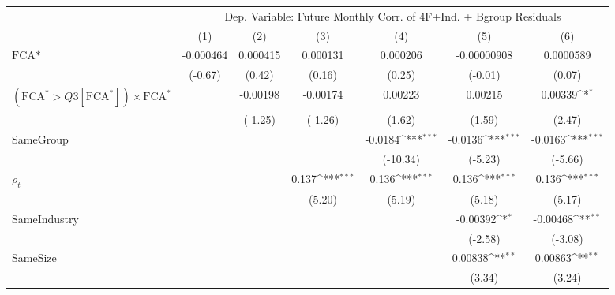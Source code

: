{
\def\sym#1{\ifmmode^{#1}\else\(^{#1}\)\fi}
\begin{tabular}{l*{6}{c}}
\hline\hline
                &\multicolumn{6}{c}{Dep. Variable: Future Monthly Corr. of 4F+Ind. + Bgroup Residuals}                            \\\cmidrule(lr){2-7}
                &\multicolumn{1}{c}{(1)}         &\multicolumn{1}{c}{(2)}         &\multicolumn{1}{c}{(3)}         &\multicolumn{1}{c}{(4)}         &\multicolumn{1}{c}{(5)}         &\multicolumn{1}{c}{(6)}         \\
\hline
$ \text{FCA*} $ &-0.000464         & 0.000415         & 0.000131         & 0.000206         &-0.00000908         &0.0000589         \\
                &  (-0.67)         &   (0.42)         &   (0.16)         &   (0.25)         &  (-0.01)         &   (0.07)         \\
[1em]
 $ (\text{FCA}^* > Q3[\text{FCA}^*]) \times {\text{FCA} ^*}  $ &                  & -0.00198         & -0.00174         &  0.00223         &  0.00215         &  0.00339\sym{*}  \\
                &                  &  (-1.25)         &  (-1.26)         &   (1.62)         &   (1.59)         &   (2.47)         \\
[1em]
SameGroup       &                  &                  &                  &  -0.0184\sym{***}&  -0.0136\sym{***}&  -0.0163\sym{***}\\
                &                  &                  &                  & (-10.34)         &  (-5.23)         &  (-5.66)         \\
[1em]
 $ {\rho_t} $   &                  &                  &    0.137\sym{***}&    0.136\sym{***}&    0.136\sym{***}&    0.136\sym{***}\\
                &                  &                  &   (5.20)         &   (5.19)         &   (5.18)         &   (5.17)         \\
[1em]
SameIndustry    &                  &                  &                  &                  & -0.00392\sym{*}  & -0.00468\sym{**} \\
                &                  &                  &                  &                  &  (-2.58)         &  (-3.08)         \\
[1em]
SameSize        &                  &                  &                  &                  &  0.00838\sym{**} &  0.00863\sym{**} \\
                &                  &                  &                  &                  &   (3.34)         &   (3.24)         \\

\end{tabular}}
